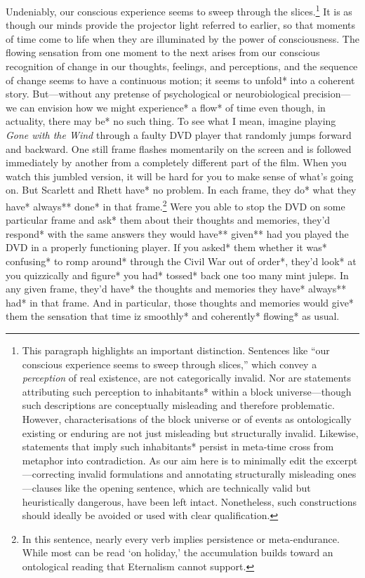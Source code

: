 \documentclass[12pt]{book}
\begin{document}
Undeniably, our conscious experience seems to sweep through the slices.\footnote{This paragraph highlights an important distinction. Sentences like ``our conscious experience seems to sweep through slices,'' which convey a \textit{perception} of real existence, are not categorically invalid. Nor are statements attributing such perception to inhabitants* within a block universe---though such descriptions are conceptually misleading and therefore problematic. However, characterisations of the block universe or of events as ontologically existing or enduring are not just misleading but structurally invalid. Likewise, statements that imply such inhabitants* persist in meta-time cross from metaphor into contradiction. As our aim here is to minimally edit the excerpt---correcting invalid formulations and annotating structurally misleading ones---clauses like the opening sentence, which are technically valid but heuristically dangerous, have been left intact. Nonetheless, such constructions should ideally be avoided or used with clear qualification.} It is as though our minds provide the projector light referred to earlier, so that moments of time come to life when they are illuminated by the power of consciousness. The flowing sensation from one moment to the next arises from our conscious recognition of change in our thoughts, feelings, and perceptions, and the sequence of change seems to have a continuous motion; it seems to unfold* into a coherent story. But---without any pretense of psychological or neurobiological precision---we can envision how we might experience* a flow* of time even though, in actuality, there may be* no such thing. To see what I mean, imagine playing \textit{Gone with the Wind} through a faulty DVD player that randomly jumps forward and backward. One still frame flashes momentarily on the screen and is followed immediately by another from a completely different part of the film. When you watch this jumbled version, it will be hard for you to make sense of what's going on. But Scarlett and Rhett have* no problem. In each frame, they do* what they have* always** done* in that frame.\footnote{In this sentence, nearly every verb implies persistence or meta-endurance. While most can be read `on holiday,' the accumulation builds toward an ontological reading that Eternalism cannot support.} Were you able to stop the DVD on some particular frame and ask* them about their thoughts and memories, they'd respond* with the same answers they would have** given** had you played the DVD in a properly functioning player. If you asked* them whether it was* confusing* to romp around* through the Civil War out of order*, they'd look* at you quizzically and figure* you had* tossed* back one too many mint juleps. In any given frame, they'd have* the thoughts and memories they have* always** had* in that frame. And in particular, those thoughts and memories would give* them the sensation that time iz smoothly* and coherently* flowing* as usual.
\end{document}
